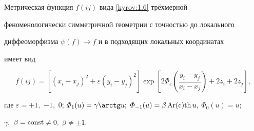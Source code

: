 \begin{theorem}

Метрическая функция $f(ij)$ вида \eqref{kyrov:1.6} трёхмерной

феноменологически симметричной геометрии с точностью до локального

диффеоморфизма $\psi(f)\to f$ и в подходящих локальных координатах

имеет вид

\begin{equation}

\label{kyrov:1.9}

f(ij) = \left[(x_i - x_j)^2 + \varepsilon(y_i - y_j)^2\right]\exp\left[2\varPhi_{\varepsilon}\left(\frac{y_i-y_j}{x_i-x_j}\right) + 2z_i+2z_j\right],

\end{equation}

где $\varepsilon = +1,$ $-1,$ $0$; $ \varPhi_{1}(u) = \gamma\arctg

u;$ $\varPhi_{-1}(u) = \beta{\rm \, Ar(c)th\,} u,$ $\varPhi_{0}(u) = u;$

$\gamma,$ $\beta = {\rm const} \ne 0,$ $\beta \ne \pm1.$

\end{theorem}



